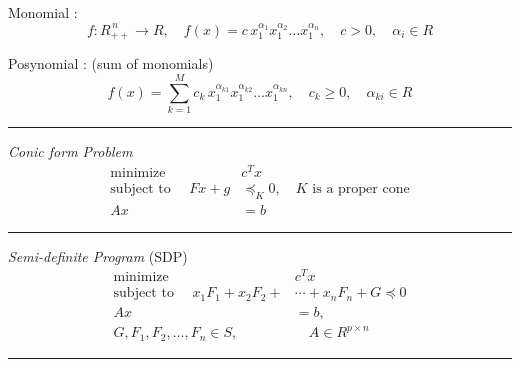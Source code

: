 Monomial : \[f:R_{++}^{\,n} \rightarrow R, \quad
f(x) = c \, x_1^{\alpha_1} x_1^{\alpha_2} \ldots x_1^{\alpha_n}, 
\quad c > 0, 
\quad \alpha_i \in R\]

Posynomial : (sum of monomials) 
\[f(x) = 
\sum_{k=1}^M c_k \, x_1^{\alpha_{k1}} x_1^{\alpha_{k2}} \ldots x_1^{\alpha_{kn}}, 
\quad c_k \ge 0, 
\quad \alpha_{ki} \in R\]
\rule{\linewidth}{0.1mm}
%
%
\noindent
\textit{Conic form Problem}
\begin{align*}
\mbox{minimize }\quad &c^Tx\\
\mbox{subject to }\quad Fx + g &\preceq_K 0, \quad K\mbox{ is a proper cone}\\
Ax &= b
\end{align*}
\rule{\linewidth}{0.1mm}
%
%
\noindent
\textit{Semi-definite Program} (SDP)
\begin{align*}
\mbox{minimize }\quad &c^Tx\\
\mbox{subject to }\quad x_1 F_1 + x_2 F_2 +& \cdots + x_n F_n + G \preceq 0\\
Ax &= b,\\
G, F_1, F_2, \ldots, F_n \in S,& \quad A \in R^{p \times n}
\end{align*}
\rule{\linewidth}{0.1mm}
